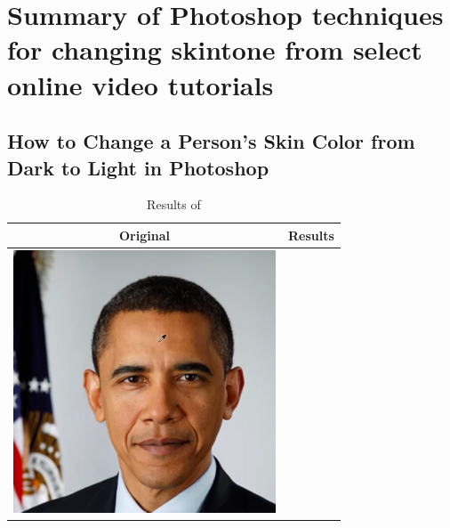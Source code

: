 \documentclass[12pt, a4paper]{article}
\begin{document}
\pagebreak

\appendix

\section{Summary of Photoshop techniques for changing skintone from select online video tutorials}
\subsection{How to Change a Person's Skin Color from Dark to Light in Photoshop}
\begin{longtable}{|c|c|}
    \caption{Results of }\\
    \hline
    Original & Results \\
    \hline
  \begin{minipage}{.29\textwidth}
    \includegraphics[width=\textwidth,height=\textheight,keepaspectratio]{images/obama_orig}
  \end{minipage} & 
  \begin{minipage}{.29\textwidth}

\end{minipage}
\end{longtable}
\end{document}
